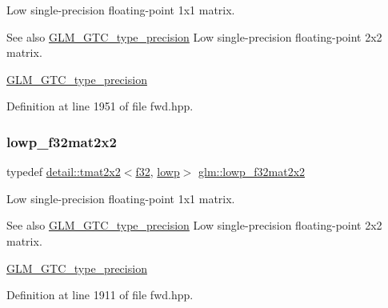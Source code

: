 Low single-\/precision floating-\/point 1x1 matrix. \begin{DoxySeeAlso}{See also}
\hyperlink{group__gtc__type__precision}{G\+L\+M\+\_\+\+G\+T\+C\+\_\+type\+\_\+precision} Low single-\/precision floating-\/point 2x2 matrix. 

\hyperlink{group__gtc__type__precision}{G\+L\+M\+\_\+\+G\+T\+C\+\_\+type\+\_\+precision} 
\end{DoxySeeAlso}


Definition at line 1951 of file fwd.\+hpp.

\mbox{\label{group__gtc__type__precision_gae5beaa9212ba199167c7c7088a70b2bd}} 
\subsubsection{\texorpdfstring{lowp\+\_\+f32mat2x2}{lowp\_f32mat2x2}}
{\footnotesize\ttfamily typedef \hyperlink{structglm_1_1detail_1_1tmat2x2}{detail\+::tmat2x2}$<$\hyperlink{group__gtc__type__precision_ga0ec999b57f5330d9021256e96038df04}{f32}, \hyperlink{namespaceglm_a0f04f086094c747d227af4425893f545ae161af3fc695e696ce3bf69f7332bc2d}{lowp}$>$ \hyperlink{group__gtc__type__precision_gae5beaa9212ba199167c7c7088a70b2bd}{glm\+::lowp\+\_\+f32mat2x2}}

Low single-\/precision floating-\/point 1x1 matrix. \begin{DoxySeeAlso}{See also}
\hyperlink{group__gtc__type__precision}{G\+L\+M\+\_\+\+G\+T\+C\+\_\+type\+\_\+precision} Low single-\/precision floating-\/point 2x2 matrix. 

\hyperlink{group__gtc__type__precision}{G\+L\+M\+\_\+\+G\+T\+C\+\_\+type\+\_\+precision} 
\end{DoxySeeAlso}


Definition at line 1911 of file fwd.\+hpp.

\mbox{\label{group__gtc__type__precision_ga7e45acb54ae2e4f5113a05b08eea5812}} 
